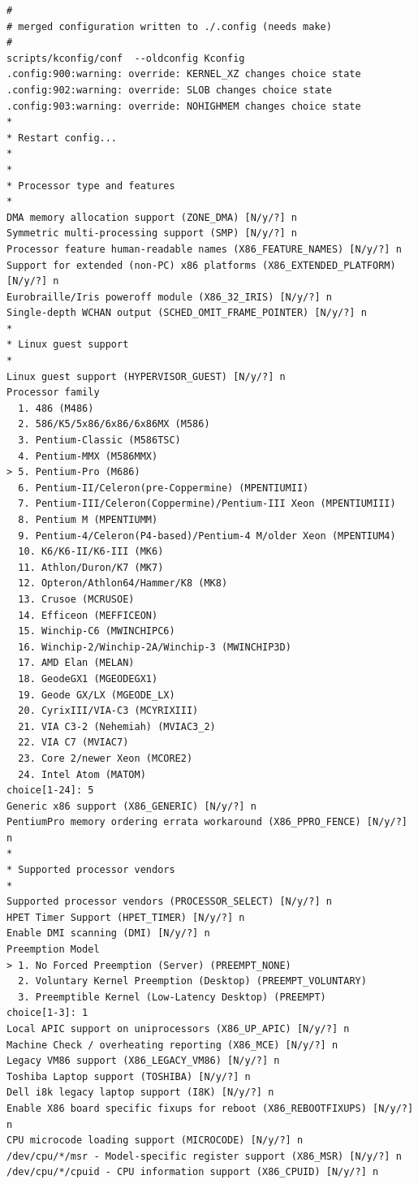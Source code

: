 \documentclass[a4paper]{article}
\begin{document}
\begin{verbatim}
#
# merged configuration written to ./.config (needs make)
#
scripts/kconfig/conf  --oldconfig Kconfig
.config:900:warning: override: KERNEL_XZ changes choice state
.config:902:warning: override: SLOB changes choice state
.config:903:warning: override: NOHIGHMEM changes choice state
*
* Restart config...
*
*
* Processor type and features
*
DMA memory allocation support (ZONE_DMA) [N/y/?] n
Symmetric multi-processing support (SMP) [N/y/?] n
Processor feature human-readable names (X86_FEATURE_NAMES) [N/y/?] n
Support for extended (non-PC) x86 platforms (X86_EXTENDED_PLATFORM) [N/y/?] n
Eurobraille/Iris poweroff module (X86_32_IRIS) [N/y/?] n
Single-depth WCHAN output (SCHED_OMIT_FRAME_POINTER) [N/y/?] n
*
* Linux guest support
*
Linux guest support (HYPERVISOR_GUEST) [N/y/?] n
Processor family
  1. 486 (M486)
  2. 586/K5/5x86/6x86/6x86MX (M586)
  3. Pentium-Classic (M586TSC)
  4. Pentium-MMX (M586MMX)
> 5. Pentium-Pro (M686)
  6. Pentium-II/Celeron(pre-Coppermine) (MPENTIUMII)
  7. Pentium-III/Celeron(Coppermine)/Pentium-III Xeon (MPENTIUMIII)
  8. Pentium M (MPENTIUMM)
  9. Pentium-4/Celeron(P4-based)/Pentium-4 M/older Xeon (MPENTIUM4)
  10. K6/K6-II/K6-III (MK6)
  11. Athlon/Duron/K7 (MK7)
  12. Opteron/Athlon64/Hammer/K8 (MK8)
  13. Crusoe (MCRUSOE)
  14. Efficeon (MEFFICEON)
  15. Winchip-C6 (MWINCHIPC6)
  16. Winchip-2/Winchip-2A/Winchip-3 (MWINCHIP3D)
  17. AMD Elan (MELAN)
  18. GeodeGX1 (MGEODEGX1)
  19. Geode GX/LX (MGEODE_LX)
  20. CyrixIII/VIA-C3 (MCYRIXIII)
  21. VIA C3-2 (Nehemiah) (MVIAC3_2)
  22. VIA C7 (MVIAC7)
  23. Core 2/newer Xeon (MCORE2)
  24. Intel Atom (MATOM)
choice[1-24]: 5
Generic x86 support (X86_GENERIC) [N/y/?] n
PentiumPro memory ordering errata workaround (X86_PPRO_FENCE) [N/y/?] n
*
* Supported processor vendors
*
Supported processor vendors (PROCESSOR_SELECT) [N/y/?] n
HPET Timer Support (HPET_TIMER) [N/y/?] n
Enable DMI scanning (DMI) [N/y/?] n
Preemption Model
> 1. No Forced Preemption (Server) (PREEMPT_NONE)
  2. Voluntary Kernel Preemption (Desktop) (PREEMPT_VOLUNTARY)
  3. Preemptible Kernel (Low-Latency Desktop) (PREEMPT)
choice[1-3]: 1
Local APIC support on uniprocessors (X86_UP_APIC) [N/y/?] n
Machine Check / overheating reporting (X86_MCE) [N/y/?] n
Legacy VM86 support (X86_LEGACY_VM86) [N/y/?] n
Toshiba Laptop support (TOSHIBA) [N/y/?] n
Dell i8k legacy laptop support (I8K) [N/y/?] n
Enable X86 board specific fixups for reboot (X86_REBOOTFIXUPS) [N/y/?] n
CPU microcode loading support (MICROCODE) [N/y/?] n
/dev/cpu/*/msr - Model-specific register support (X86_MSR) [N/y/?] n
/dev/cpu/*/cpuid - CPU information support (X86_CPUID) [N/y/?] n

\end{verbatim}
\end{document}
